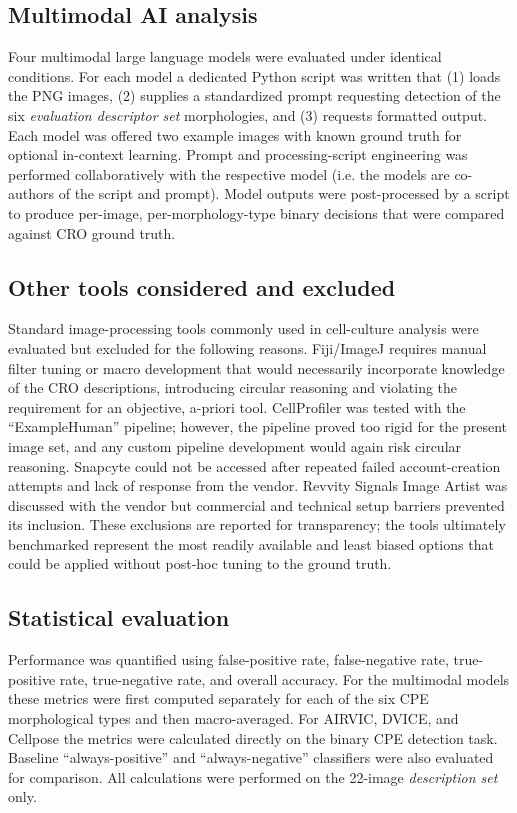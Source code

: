\subsection*{Multimodal AI analysis}
Four multimodal large language models \cite{chatgpt} \cite{claude} \cite{gemini} \cite{grok} were evaluated under identical conditions. For each model a dedicated Python script was written that (1) loads the PNG images, (2) supplies a standardized prompt requesting detection of the six \textit{evaluation descriptor set} morphologies, and (3) requests formatted output. Each model was offered two example images with known ground truth for optional in-context learning. Prompt and processing-script engineering was performed collaboratively with the respective model (i.e. the models are co-authors of the script and prompt). Model outputs were post-processed by a script to produce per-image, per-morphology-type binary decisions that were compared against CRO ground truth.

\subsection*{Other tools considered and excluded}
Standard image-processing tools commonly used in cell-culture analysis were evaluated but excluded for the following reasons. Fiji/ImageJ \cite{fiji} requires manual filter tuning or macro development that would necessarily incorporate knowledge of the CRO descriptions, introducing circular reasoning and violating the requirement for an objective, a-priori tool. CellProfiler \cite{cellprofiler} was tested with the ``ExampleHuman'' pipeline; however, the pipeline proved too rigid for the present image set, and any custom pipeline development would again risk circular reasoning. Snapcyte \cite{snapcyte} could not be accessed after repeated failed account-creation attempts and lack of response from the vendor. Revvity Signals Image Artist \cite{revvityIA} was discussed with the vendor but commercial and technical setup barriers prevented its inclusion. These exclusions are reported for transparency; the tools ultimately benchmarked represent the most readily available and least biased options that could be applied without post-hoc tuning to the ground truth.

\subsection*{Statistical evaluation}
Performance was quantified using false-positive rate, false-negative rate, true-positive rate, true-negative rate, and overall accuracy. For the multimodal models these metrics were first computed separately for each of the six CPE morphological types and then macro-averaged. For AIRVIC, DVICE, and Cellpose the metrics were calculated directly on the binary CPE detection task. Baseline ``always-positive'' and ``always-negative'' classifiers were also evaluated for comparison. All calculations were performed on the 22-image \textit{description set} only.